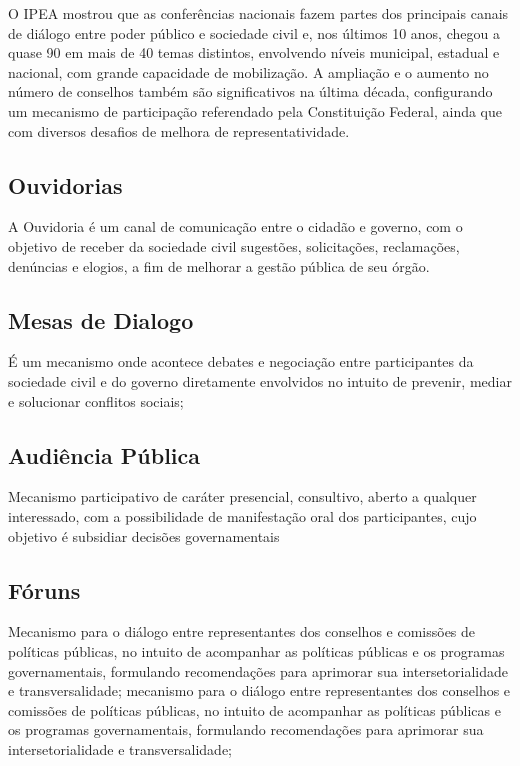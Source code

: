O IPEA \citeyear{avritzer2012conferencias} mostrou que as conferências nacionais fazem partes dos principais canais de diálogo entre poder público e sociedade civil e, nos últimos 10 anos, chegou a quase 90 em mais de 40 temas distintos, envolvendo níveis municipal, estadual e nacional, com grande capacidade de mobilização. A ampliação e o aumento no número de conselhos também são significativos na última década, configurando um mecanismo de participação referendado pela Constituição Federal, ainda que com diversos desafios de melhora de representatividade. \cite{solagna2014metodologias}

\subsection*{Ouvidorias}

A Ouvidoria é um canal de comunicação entre o cidadão e governo, com o objetivo de receber da sociedade civil sugestões, solicitações, reclamações, denúncias e elogios, a fim de melhorar a gestão pública de seu órgão.

\subsection*{Mesas de Dialogo}

É um mecanismo onde acontece debates e negociação entre participantes da sociedade civil e do governo diretamente envolvidos no intuito de prevenir, mediar e solucionar conflitos sociais;

\subsection*{Audiência Pública}

Mecanismo participativo de caráter presencial, consultivo, aberto a qualquer interessado, com a possibilidade de manifestação oral dos participantes, cujo objetivo é subsidiar decisões governamentais

\subsection*{Fóruns}

Mecanismo para o diálogo entre representantes dos conselhos e comissões de políticas públicas, no intuito de acompanhar as políticas públicas e os programas governamentais, formulando recomendações para aprimorar sua intersetorialidade e transversalidade; mecanismo para o diálogo entre representantes dos conselhos e comissões de políticas públicas, no intuito de acompanhar as políticas públicas e os programas governamentais, formulando recomendações para aprimorar sua intersetorialidade e transversalidade;


